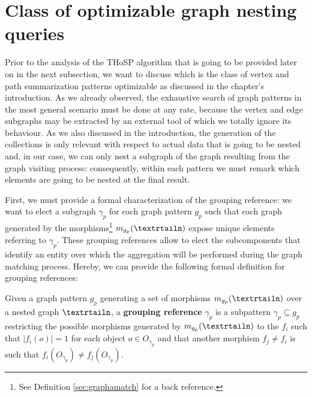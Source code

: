 \section{Class of optimizable graph nesting queries}\label{sec:optimizableClass}
Prior to the analysis of the THoSP algorithm that is going to be provided later on in the next subsection, we want to discuss which is the class of vertex and path summarization patterns optimizable as discussed in the chapter's introduction. As we already observed, %
the exhaustive search of graph patterns in the most general scenario must be done at any rate, because the vertex and  edge subgraphs may be extracted by an external tool of which we totally ignore its behaviour. As we also discussed in the introduction, the generation of the collections is only relevant with respect to actual data that is going to be nested and, in our case, we can only nest a subgraph of the graph resulting from the graph visiting process: consequently, within each pattern we must remark which elements are going to be nested at the final result.

First, we must provide a formal characterization of the grouping reference: we want to elect a subgraph $\gamma_p$ for each graph pattern $g_p$ such that each graph generated by the morphisms\footnote{See Definition \vref{sec:graphamatch} for a back reference.} $m_{g_p}(\nested)$ expose unique elements referring to $\gamma_p$. %
These grouping references allow to elect the subcomponents that identify an entity over which the aggregation will be performed during the graph matching process. Hereby, we can provide the following formal definition for grouping references:
\begin{definition}
Given a graph pattern $g_p$ generating a set of morphisms $m_{g_p}(\nested)$ over a nested graph $\nested$, a \textbf{grouping reference} $\gamma_p$ is a subpattern $\gamma_p\subseteq g_p$ restricting the possible morphisms generated by $m_{g_p}(\nested)$ to the $f_i$ such that $|f_i(o)|=1$ for each object $o\in O_{\gamma_p}$ and that another morphism $f_j\neq f_i$ is such that $f_i(O_{\gamma_p})\neq f_j(O_{\gamma_p})$.
\end{definition}

